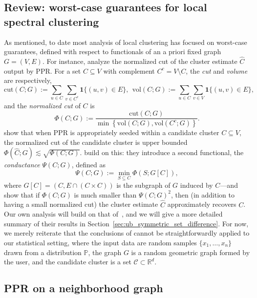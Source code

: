 \documentclass[11pt,twoside]{article}
\newcommand{\Reals}{\mathbb{R}}
\newcommand{\set}[1]{\left\{#1\right\}}
\newcommand{\1}{\mathbf{1}}
\newcommand{\Rd}{\Reals^d}
\newcommand{\mc}[1]{\mathcal{#1}}
\newcommand{\wh}[1]{\widehat{#1}}
\newcommand{\vol}{\mathrm{vol}}
\newcommand{\cut}{\mathrm{cut}}
\begin{document}
\subsection{Review: worst-case guarantees for local spectral clustering}
As mentioned, to date most analysis of local clustering has focused on worst-case guarantees, defined with respect to functionals of an a priori fixed graph $G = (V,E)$.  For instance, \cite{andersen2006} analyze the normalized cut of the cluster estimate $\wh{C}$ output by PPR. For a set $C \subseteq V$ with complement $C^c = V \!\setminus\! C$, the \emph{cut} and \emph{volume} are respectively,
\begin{equation}
\label{eqn:cut_volume}
\cut(C;G) := \sum_{u \in C} \sum_{v \in C^c}
\1\{(u,v) \in E\},~~ \vol(C; G) := \sum_{u \in C}  \sum_{v \in V} \1\{(u,v) \in E\},
\end{equation}
and the \emph{normalized cut} of $C$ is
\begin{equation}
\label{eqn:normalized_cut}
\Phi(C; G) := \frac{\cut(C;G)}{\min \set{\vol(C; G), \vol(C^c; G)}}.
\end{equation} 
\cite{andersen2006} show that when PPR is appropriately seeded within a candidate cluster $C \subseteq V$, the normalized cut of the candidate cluster is upper bounded $\Phi(\wh{C};G) \lesssim \sqrt{\Phi(C;G)}$. \cite{zhu2013} build on this: they introduce a second functional, the \emph{conductance} $\Psi(C;G)$, defined as 
\begin{equation}
\label{eqn:conductance}
\Psi(C;G) := \min_{S \subseteq C} \Phi(S;G[C]),
\end{equation}
where $G[C] = (C,E \cap (C \times C))$ is the subgraph of $G$ induced by $C$---and show that if $\Phi(C;G)$ is much smaller than $\Psi(C;G)^2$, then (in addition to having a small normalized cut) the cluster estimate $\wh{C}$ approximately recovers $C$. Our own analysis will build on that of~\cite{zhu2013}, and we will give a more detailed summary of their results in Section~\ref{sec:ub_symmetric_set_difference}.
For now, we merely reiterate that the conclusions of \citep{andersen2006,zhu2013} cannot be straightforwardly applied to our statistical setting, where the input data are random samples $\{x_1,\ldots,x_n\}$ drawn from a distribution $\mathbb{P}$, the graph $G$ is a random geometric graph formed by the user, and the candidate cluster is a set $\mc{C} \subset \Rd$. 

\subsection{PPR on a neighborhood graph}
\end{document}
